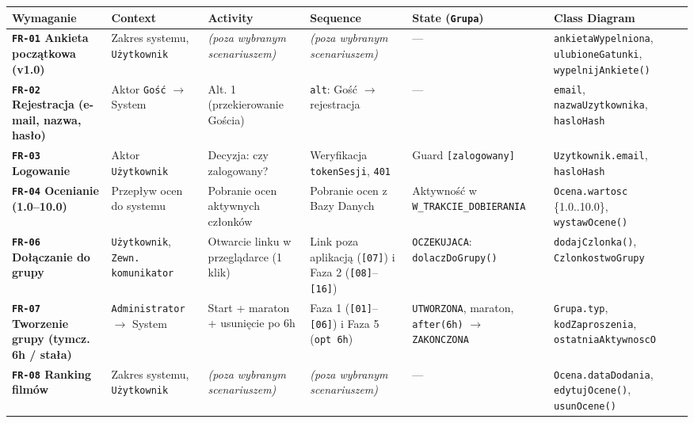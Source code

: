 \documentclass[10pt,a4paper]{article}
\begin{document}
{\footnotesize
\setlength{\tabcolsep}{4pt}
\begin{longtable}{>{\raggedright\arraybackslash\bfseries}p{2.55cm} >{\raggedright\arraybackslash}p{2.4cm} >{\raggedright\arraybackslash}p{2.4cm} >{\raggedright\arraybackslash}p{2.4cm} >{\raggedright\arraybackslash}p{2.75cm} >{\raggedright\arraybackslash}p{3.15cm}}
\toprule
\rowcolor{Navy}
{\color{white}Wymaganie} & {\color{white}\textbf{Context}} & {\color{white}\textbf{Activity}} & {\color{white}\textbf{Sequence}} & {\color{white}\textbf{State (\texttt{Grupa})}} & {\color{white}\textbf{Class Diagram}} \\
\midrule
\endhead
\bottomrule
\endfoot
\texttt{FR-01} Ankieta początkowa (v1.0) & Zakres systemu, \texttt{Użytkownik} & \textit{(poza wybranym scenariuszem)} & \textit{(poza wybranym scenariuszem)} & — & \texttt{ankietaWypelniona}, \texttt{ulubioneGatunki}, \texttt{wypelnijAnkiete()} \\
\rowcolor{RowAlt}
\texttt{FR-02} Rejestracja (e-mail, nazwa, hasło) & Aktor \texttt{Gość} $\to$ System & Alt. 1 (przekierowanie Gościa) & \texttt{alt}: Gość $\to$ rejestracja & — & \texttt{email}, \texttt{nazwaUzytkownika}, \texttt{hasloHash} \\
\texttt{FR-03} Logowanie & Aktor \texttt{Użytkownik} & Decyzja: czy zalogowany? & Weryfikacja \texttt{tokenSesji}, \texttt{401} & Guard \texttt{[zalogowany]} & \texttt{Uzytkownik.email}, \texttt{hasloHash} \\
\rowcolor{RowAlt}
\texttt{FR-04} Ocenianie (1.0–10.0) & Przepływ ocen do systemu & Pobranie ocen aktywnych członków & Pobranie ocen z Bazy Danych & Aktywność w \texttt{W\_TRAKCIE\_\allowbreak DOBIERANIA} & \texttt{Ocena.wartosc} \{1.0..10.0\}, \texttt{wystawOcene()} \\
\texttt{FR-06} Dołączanie do grupy & \texttt{Użytkownik}, \texttt{Zewn. komunikator} & Otwarcie linku w przeglądarce (1 klik) & Link poza aplikacją (\texttt{[07]}) i Faza 2 (\texttt{[08]}–\texttt{[16]}) & \texttt{OCZEKUJACA}: \texttt{dolaczDoGrupy()} & \texttt{dodajCzlonka()}, \texttt{CzlonkostwoGrupy} \\
\rowcolor{RowAlt}
\texttt{FR-07} Tworzenie grupy (tymcz. 6h / stała) & \texttt{Administrator} $\to$ System & Start + maraton + usunięcie po 6h & Faza 1 (\texttt{[01]}–\texttt{[06]}) i Faza 5 (\texttt{opt 6h}) & \texttt{UTWORZONA}, maraton, \texttt{after(6h)} $\to$ \texttt{ZAKONCZONA} & \texttt{Grupa.typ}, \texttt{kodZaproszenia}, \texttt{ostatniaAktywnoscO} \\
\texttt{FR-08} Ranking filmów & Zakres systemu, \texttt{Użytkownik} & \textit{(poza wybranym scenariuszem)} & \textit{(poza wybranym scenariuszem)} & — & \texttt{Ocena.dataDodania}, \texttt{edytujOcene()}, \texttt{usunOcene()} \\

\end{longtable}}
\end{document}
